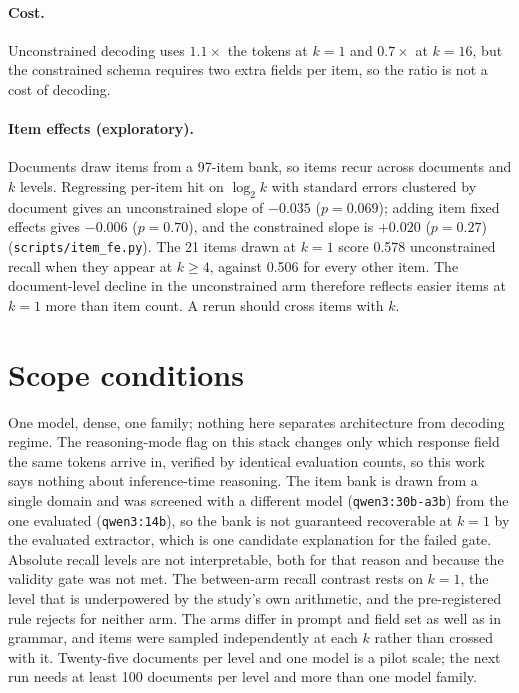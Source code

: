 \documentclass[11pt]{article}
\newcommand{\code}[1]{\texttt{\small #1}}
\begin{document}
\paragraph{Cost.} Unconstrained decoding uses $1.1\times$ the tokens at $k = 1$
and $0.7\times$ at $k = 16$, but the constrained schema requires two extra fields
per item, so the ratio is not a cost of decoding.

\paragraph{Item effects (exploratory).} Documents draw items from a 97-item bank,
so items recur across documents and $k$ levels. Regressing per-item hit on
$\log_2 k$ with standard errors clustered by document gives an unconstrained slope
of $-0.035$ ($p = 0.069$); adding item fixed effects gives $-0.006$ ($p = 0.70$),
and the constrained slope is $+0.020$ ($p = 0.27$) (\code{scripts/item\_fe.py}).
The 21 items drawn at $k = 1$ score 0.578 unconstrained recall when they appear at
$k \ge 4$, against 0.506 for every other item. The document-level decline in the
unconstrained arm therefore reflects easier items at $k = 1$ more than item count.
A rerun should cross items with $k$.

\section{Scope conditions}

One model, dense, one family; nothing here separates architecture from decoding
regime. The reasoning-mode flag on this stack changes only which response field
the same tokens arrive in, verified by identical evaluation counts, so this work
says nothing about inference-time reasoning. The item bank is drawn from a single
domain and was screened with a different model (\code{qwen3:30b-a3b}) from the
one evaluated (\code{qwen3:14b}), so the bank is not guaranteed recoverable at
$k = 1$ by the evaluated extractor, which is one candidate explanation for the
failed gate. Absolute recall levels are not interpretable, both for that reason
and because the validity gate was not met. The between-arm recall contrast rests
on $k = 1$, the level that is underpowered by the study's own arithmetic, and the
pre-registered rule rejects for neither arm. The arms differ in prompt and field
set as well as in grammar, and items were sampled independently at each $k$
rather than crossed with it. Twenty-five documents per level and one model is a pilot
scale; the next run needs at least 100 documents per level and more than one
model family.
\end{document}
